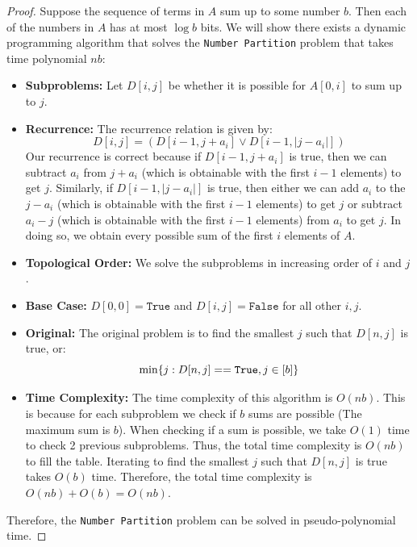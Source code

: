 \documentclass[11pt]{scrartcl}
\theoremstyle{dotlessP}
\theoremstyle{dotlessN}
\theoremstyle{dotN}
\DeclarePairedDelimiter\set{\{}{\}}
\begin{document}
\begin{proof}
   Suppose the sequence of terms in $A$ sum up to some number  $b$. Then each of the numbers in  $A$ has at most  $\log
   b$ bits. We will show there exists a dynamic programming algorithm that solves the \texttt{Number Partition} problem
   that takes time polynomial $nb$:
   \begin{itemize}
       \item \textbf{Subproblems:} Let $D[i,j]$ be whether it is possible for  $A[0,i]$ to sum up to $j$.
   
  \item \textbf{Recurrence:} The recurrence relation is given by:
    \[
   D[i,j] = (D[i-1,j+a_i] \lor D[i-1,|j-a_i|])  
   \] 
    Our recurrence is correct because if $D[i-1,j+a_i]$ is true, then we can subtract $a_i$ from $j + a_i$ (which is obtainable with the first $i-1$ elements) to get $j$. 
    Similarly, if $D[i-1,|j-a_i|]$ is true, then either we can add $a_i$ to the $j - a_i$ (which is obtainable with the first $i-1$ elements) to get $j$ or subtract $a_i - j$ (which is obtainable with the first $i-1$ elements) from $a_i$ to get $j$. 
    In doing so, we obtain every
    possible sum of the first $i$ elements of $A$. 

   \item\textbf{Topological Order:} We solve the subproblems in increasing order of $i$ and $j$.

    \item\textbf{Base Case:} $D[0,0] = \texttt{True}$ and $D[i,j] = \texttt{False}$ for all other $i,j$.

    \item\textbf{Original:} The original problem is to find the smallest $j$ such that $D[n,j]$ is true, or:
    \[
    \min \set*{j : D[n,j] == \texttt{True}, j \in [b]}
    \]

   \item \textbf{Time Complexity:} The time complexity of this algorithm is $O(nb)$. This is because for each
    subproblem we check if $b$ sums are possible (The maximum sum is $b$). When checking if a sum is possible, we
    take  $O(1)$ time to check 2 previous subproblems. Thus, the total time complexity is $O(nb)$ to fill the
    table. Iterating to find the smallest $j$ such that $D[n,j]$ is true takes $O(b)$ time. Therefore, the total time
    complexity is $O(nb) + O(b) = O(nb)$.
   \end{itemize}
    Therefore, the \texttt{Number Partition} problem can be solved in pseudo-polynomial time.
\end{proof}
\end{document}

